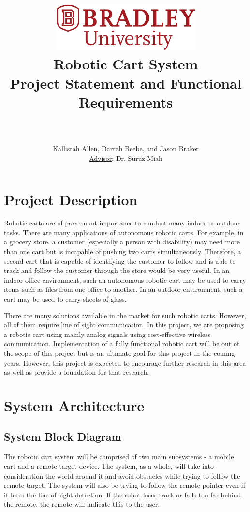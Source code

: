 \documentclass[12pt]{article} %
\title{
    \begin{center}
        \href{http://www.bradley.edu}{\includegraphics[height=1in]{figs/logoBU1-Print}}
        \vskip10pt
        \HRule \\[0.4cm]
        {\Huge \bfseries Robotic Cart System \\\Large Project Statement and Functional Requirements}\\[0.4cm] %
        \HRule \\[0.4cm]
    \end{center}
    }
\author{Kallistah Allen, Darrah Beebe, and Jason Braker \\ \underline{Advisor}: Dr. Suruz Miah}
\begin{document}
\maketitle

\newpage %

\section{Project Description}
Robotic carts are of paramount importance to conduct many indoor or outdoor tasks. There are many applications of autonomous robotic carts. For example, in a grocery store, a customer (especially a person with disability) may need more than one cart but is incapable of pushing two carts simultaneously. Therefore, a second cart that is capable of identifying the customer to follow and is able to track and follow the customer through the store would be very useful. In an indoor office environment, such an autonomous robotic cart may be used to carry items such as files from one office to another. In an outdoor environment, such a cart may be used to carry sheets of glass.

There are many solutions available in the market for such robotic carts. However, all of them require line of sight communication. In this project, we are proposing a robotic cart using mainly analog signals using cost-effective wireless communication. Implementation of a fully functional robotic cart will be out of the scope of this project but is an ultimate goal for this project in the coming years. However, this project is expected to encourage further research in this area as well as provide a foundation for that research.

\section{System Architecture}
\subsection{System Block Diagram}
The robotic cart system will be comprised of two main subsystems - a mobile cart and a remote target device. The system, as a whole, will take into consideration the world around it and avoid obstacles while trying to follow the remote target.  The system will also be trying to follow the remote pointer even if it loses the line of sight detection.  If the robot loses track or falls too far behind the remote, the remote will indicate this to the user.
\end{document}
